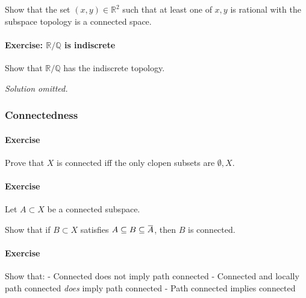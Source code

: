 Show that the set \((x, y) \in {\mathbb{R}}^2\) such that at least one
of \(x, y\) is rational with the subspace topology is a connected space.

\hypertarget{exercise-mathbbrmathbbq-is-indiscrete}{%
\paragraph{\texorpdfstring{Exercise: \({\mathbb{R}}/{\mathbb{Q}}\) is
indiscrete}{Exercise: \{\textbackslash mathbb\{R\}\}/\{\textbackslash mathbb\{Q\}\} is indiscrete}}\label{exercise-mathbbrmathbbq-is-indiscrete}}

\begin{problem}[?]

Show that \({\mathbb{R}}/{\mathbb{Q}}\) has the indiscrete topology.

\end{problem}

\emph{Solution omitted.}

\hypertarget{connectedness-1}{%
\subsubsection{Connectedness}\label{connectedness-1}}

\hypertarget{exercise-6}{%
\paragraph{Exercise}\label{exercise-6}}

Prove that \(X\) is connected iff the only clopen subsets are
\(\emptyset, X\).

\hypertarget{exercise-7}{%
\paragraph{Exercise}\label{exercise-7}}

Let \(A \subset X\) be a connected subspace.

Show that if \(B\subset X\) satisfies
\(A\subseteq B \subseteq \mkern 1.5mu\overline{\mkern-1.5muA\mkern-1.5mu}\mkern 1.5mu\),
then \(B\) is connected.

\hypertarget{exercise-8}{%
\paragraph{Exercise}\label{exercise-8}}

Show that: - Connected does not imply path connected - Connected and
locally path connected \emph{does} imply path connected - Path connected
implies connected

